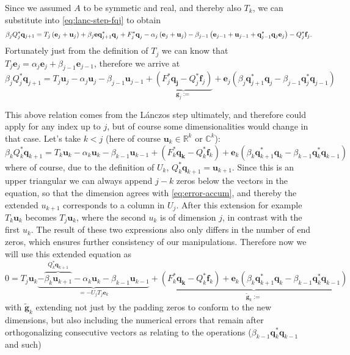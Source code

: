 \documentclass{article}
\begin{document}
Since we assumed $A$ to be symmetic and real, and thereby also $T_k$, we can substitute into \autoref{eq:lanc-step-fqj} to obtain
\begin{equation*}
	\beta_jQ_j^\ast\mathbf{q}_{j+1}=T_j \left({\bf e}_j+ {\bf u}_j\right) +\beta_{j}\mathbf{e}\mathbf{q}_{j+1}^{\ast}\textbf{q}_j + F_j^\ast \textbf{q}_j-\alpha_j \left({\bf e}_j+ {\bf u}_j\right)-\beta_{j-1}\left({\bf e}_{j-1}+ {\bf u}_{j-1} + {\bf q}_{j-1}^\ast {\bf q}_j {\bf e}_j\right) - Q_j^\ast\textbf{f}_j.
\end{equation*}
Fortunately just from the definition of $T_j$ we can know that $T_j \textbf{e}_j = \alpha_{j} \textbf{e}_j + \beta_{j-1} \textbf{e}_{j-1}$, therefore we arrive at
\begin{equation}\label{eq:error-accum}
	\beta_jQ_{j}^{\ast}\mathbf{q}_{j+1}=T_{j}\mathbf{u}_j-\alpha_j\mathbf{u}_j-\beta_{j-1}\mathbf{u}_{j-1}+\underbrace{(F_j^{\ast}\mathbf{q_j}-Q_j^{\ast}\mathbf{f}_j)}_{\mathbf{g}_j:=}+\mathbf{e}_j(\beta_{j}\mathbf{q}_{j+1}^{\ast}\mathbf{q}_{j}-\beta_{j-1}\mathbf{q}_{j}^{\ast}\mathbf{q}_{j-1})
\end{equation}

This above relation comes from the L\'anczos step ultimately, and therefore could apply for any index up to $j$, but of course some dimensionalities would change in that case. Let's take $k<j$ (here of course $\textbf{u}_k \in \mathbb{R}^k$ or $\mathbb{C}^k$):
\begin{equation*}
	\beta_kQ_{k}^{\ast}\mathbf{q}_{k+1}=T_{k}\mathbf{u}_k-\alpha_k\mathbf{u}_k-\beta_{k-1}\mathbf{u}_{k-1}+(F_k^{\ast}\mathbf{q_k}-Q_k^{\ast}\mathbf{f}_k)+\mathbf{e}_k(\beta_{k}\mathbf{q}_{k+1}^{\ast}\mathbf{q}_{k}-\beta_{k-1}\mathbf{q}_{k}^{\ast}\mathbf{q}_{k-1})
\end{equation*}
where of course, due to the definition of $U_k$, $Q_{k}^{\ast}\mathbf{q}_{k+1} = \textbf{u}_{k+1}$. Since this is an upper triangular we can always append $j-k$ zeros below the vectors in the equation, so that the dimension agrees with \autoref{eq:error-accum}, and thereby the extended $u_{k+1} $ corresponds to a column in $U_j$. After this extension for example $T_{k}\mathbf{u}_k$ becomes $T_{j}\mathbf{u}_k$, where the second $u_k$ is of dimension $j$, in contrast with the first $u_k$. The result of these two expressions also only differs in the number of end zeros, which ensures further consistency of our manipulations. Therefore now we will use this extended equation as 
\begin{equation}\label{eq:inbetween-error-accum}
	0 =T_{j}\mathbf{u}_k\underbrace{-\overbrace{\beta_k \mathbf{u}_{k+1}}^{Q_{k}^{\ast}\mathbf{q}_{k+1}}-\alpha_k\mathbf{u}_k-\beta_{k-1}\mathbf{u}_{k-1}}_{=-U_j T_j \textbf{e}_k}+\underbrace{(F_k^{\ast}\mathbf{q_k}-Q_k^{\ast}\mathbf{f}_k)+\mathbf{e}_k(\beta_{k}\mathbf{q}_{k+1}^{\ast}\mathbf{q}_{k}-\beta_{k-1}\mathbf{q}_{k}^{\ast}\mathbf{q}_{k-1})}_{\tilde{\textbf{g}}_k := }
\end{equation}
with $\tilde{\textbf{g}}_k$ extending not just by the padding zeros to conform to the new dimensions, but also including the numerical errors that remain after orthogonalizing consecutive vectors as relating to the operations ($\beta_{k-1}\textbf{q}_k^\ast \textbf{q}_{k-1}$ and such)
\end{document}
